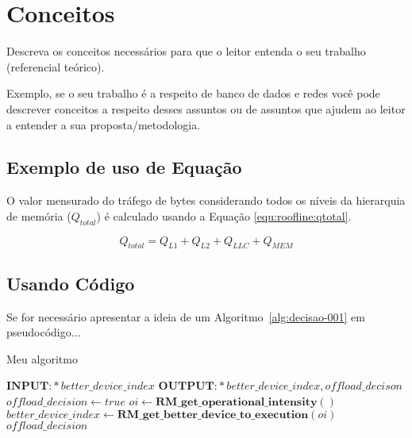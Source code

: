 \chapter{Conceitos}
\label{cap:conceitos}

Descreva os conceitos necessários para que o leitor entenda o seu trabalho (referencial teórico). 

Exemplo, se o seu trabalho é a respeito de banco de dados e redes você pode descrever conceitos a respeito desses assuntos ou de assuntos que ajudem ao leitor a entender a sua proposta/metodologia.

\section{Exemplo de uso de Equação}
\label{cap:conceitos:sec:usando:equacoes}

O valor mensurado do tráfego de bytes considerando todos os níveis da hierarquia de memória ($Q_{total}$) é calculado usando a Equação \ref{equ:roofline:qtotal}.

\begin{equation}\label{equ:roofline:qtotal}
Q_{total} = Q_{L1} + Q_{L2} + Q_{LLC} + Q_{MEM}
\end{equation}

\section{Usando Código}
\label{cap:conceitos:sec:usando:codigo}

Se for necessário apresentar a ideia de um Algoritmo~\ref{alg:decisao-001} em pseudocódigo...

\begin{algorithm}[H]
	\caption{Meu algoritmo}
	\label{alg:decisao-001}
	\begin{algorithmic}[1]
		\STATE $\textbf{INPUT:}*better\_device\_index$
		\STATE $\textbf{OUTPUT:} *better\_device\_index, offload\_decison$
		\STATE $offload\_decision \leftarrow true$
		\STATE $oi \leftarrow \textbf{RM\_get\_operational\_intensity}()$
		\STATE $better\_device\_index \leftarrow \textbf{RM\_get\_better\_device\_to\_execution}(oi)$ 
		\ELSE
		\ENDIF
		\RETURN $offload\_decision$
	\end{algorithmic}
\end{algorithm}

